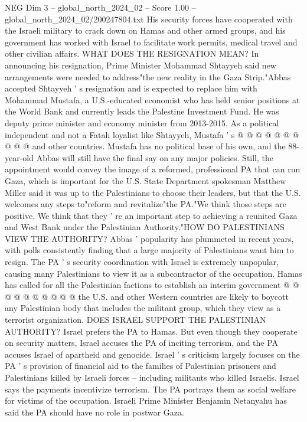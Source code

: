 \begin{textsample}{NEG Dim 3 – global\_north\_2024\_02 – Score 1.00 – global\_north\_2024\_02/200247804.txt}
His security forces have cooperated with the Israeli military to crack down on Hamas and other armed groups, and his government has worked with Israel to facilitate work permits, medical travel and other civilian affairs.
WHAT DOES THE RESIGNATION MEAN?
In announcing his resignation, Prime Minister Mohammad Shtayyeh said new arrangements were needed to address"the new reality in the Gaza Strip."Abbas accepted Shtayyeh ' s resignation and is expected to replace him with Mohammad Mustafa, a U.S.-educated economist who has held senior positions at the World Bank and currently leads the Palestine Investment Fund.
He was deputy prime minister and economy minister from 2013-2015.
As a political independent and not a Fatah loyalist like Shtayyeh, Mustafa ' s @ @ @ @ @ @ @ @ @ @ and other countries.
Mustafa has no political base of his own, and the 88-year-old Abbas will still have the final say on any major policies.
Still, the appointment would convey the image of a reformed, professional PA that can run Gaza, which is important for the U.S.
State Department spokesman Matthew Miller said it was up to the Palestinians to choose their leaders, but that the U.S. welcomes any steps to"reform and revitalize"the PA."We think those steps are positive.
We think that they ' re an important step to achieving a reunited Gaza and West Bank under the Palestinian Authority."HOW DO PALESTINIANS VIEW THE AUTHORITY?
Abbas ' popularity has plummeted in recent years, with polls consistently finding that a large majority of Palestinians want him to resign.
The PA ' s security coordination with Israel is extremely unpopular, causing many Palestinians to view it as a subcontractor of the occupation.
Hamas has called for all the Palestinian factions to establish an interim government @ @ @ @ @ @ @ @ @ @ the U.S. and other Western countries are likely to boycott any Palestinian body that includes the militant group, which they view as a terrorist organization.
DOES ISRAEL SUPPORT THE PALESTINIAN AUTHORITY?
Israel prefers the PA to Hamas.
But even though they cooperate on security matters, Israel accuses the PA of inciting terrorism, and the PA accuses Israel of apartheid and genocide.
Israel ' s criticism largely focuses on the PA ' s provision of financial aid to the families of Palestinian prisoners and Palestinians killed by Israeli forces -- including militants who killed Israelis.
Israel says the payments incentivize terrorism.
The PA portrays them as social welfare for victims of the occupation.
Israeli Prime Minister Benjamin Netanyahu has said the PA should have no role in postwar Gaza.

\end{textsample}
